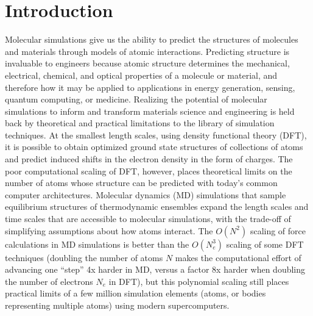 \chapter{Introduction}
Molecular simulations give us the  ability to predict the structures of molecules and materials through models of atomic interactions.   
Predicting structure is invaluable to engineers because atomic structure determines the mechanical, electrical, chemical, and optical properties of a molecule or material, and therefore how it may be applied to applications in energy generation, sensing, quantum computing, or medicine. 
Realizing the potential of molecular simulations to inform and transform materials science and engineering is held back by theoretical and practical limitations to the library of simulation techniques.
At the smallest length scales, using density functional theory (DFT), it is possible to obtain optimized ground state structures of collections of atoms and predict induced shifts in the electron density in the form of charges.
The poor computational scaling of DFT, however, places theoretical limits on the number of atoms whose structure can be predicted with today's common computer architectures.
Molecular dynamics (MD) simulations that sample equilibrium structures of thermodynamic ensembles expand the length scales and time scales that are accessible to molecular simulations, with the trade-off of simplifying assumptions about how atoms interact.
The $O(N^2)$ scaling of force calculations in MD simulations is better than the $O(N_e^3)$ scaling of some DFT techniques (doubling the number of atoms $N$ makes the computational effort of advancing one ``step'' 4x harder in MD, versus a factor 8x harder when doubling the number of electrons $N_e$ in DFT), but this polynomial scaling still places practical limits of a few million simulation elements (atoms, or bodies representing multiple atoms) using modern supercomputers. 
